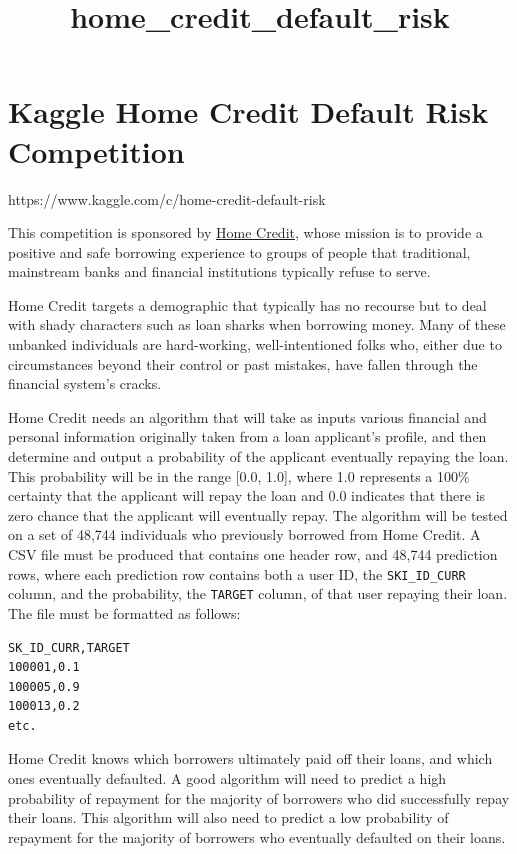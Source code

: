 \documentclass[11pt]{article}
\title{home\_credit\_default\_risk}
\begin{document}
    
    
    \maketitle
    
    

    
    \section{Kaggle Home Credit Default Risk
Competition}\label{kaggle-home-credit-default-risk-competition}

https://www.kaggle.com/c/home-credit-default-risk

This competition is sponsored by \href{http://www.homecredit.net}{Home
Credit}, whose mission is to provide a positive and safe borrowing
experience to groups of people that traditional, mainstream banks and
financial institutions typically refuse to serve.

Home Credit targets a demographic that typically has no recourse but to
deal with shady characters such as loan sharks when borrowing money.
Many of these unbanked individuals are hard-working, well-intentioned
folks who, either due to circumstances beyond their control or past
mistakes, have fallen through the financial system's cracks.

Home Credit needs an algorithm that will take as inputs various
financial and personal information originally taken from a loan
applicant's profile, and then determine and output a probability of the
applicant eventually repaying the loan. This probability will be in the
range {[}0.0, 1.0{]}, where 1.0 represents a 100\% certainty that the
applicant will repay the loan and 0.0 indicates that there is zero
chance that the applicant will eventually repay. The algorithm will be
tested on a set of 48,744 individuals who previously borrowed from Home
Credit. A CSV file must be produced that contains one header row, and
48,744 prediction rows, where each prediction row contains both a user
ID, the \texttt{SKI\_ID\_CURR} column, and the probability, the
\texttt{TARGET} column, of that user repaying their loan. The file must
be formatted as follows:

\begin{verbatim}
SK_ID_CURR,TARGET
100001,0.1
100005,0.9
100013,0.2
etc.
\end{verbatim}

Home Credit knows which borrowers ultimately paid off their loans, and
which ones eventually defaulted. A good algorithm will need to predict a
high probability of repayment for the majority of borrowers who did
successfully repay their loans. This algorithm will also need to predict
a low probability of repayment for the majority of borrowers who
eventually defaulted on their loans.
\end{document}
